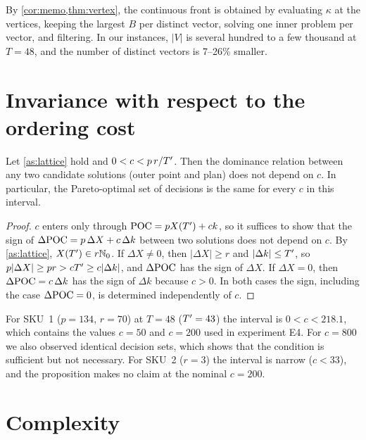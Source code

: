 By \cref{cor:memo,thm:vertex}, the continuous front is obtained by evaluating $\kappa$ at
the vertices, keeping the largest $B$ per distinct vector, solving one inner problem per
vector, and filtering. In our instances, $\lvert V\rvert$ is several hundred to a few
thousand at $T=48$, and the number of distinct vectors is 7--26\% smaller.

\section{Invariance with respect to the ordering cost}\label{sec:invariance}

\begin{proposition}\label{prop:c}
  Let \cref{as:lattice} hold and $0<c<p\,r/T'$. Then the dominance relation between any
  two candidate solutions (outer point and plan) does not depend on $c$. In particular,
  the Pareto-optimal set of decisions is the same for every $c$ in this interval.
\end{proposition}

\begin{proof}
  $c$ enters only through $\mathrm{POC}=pX(T')+ck$, so it suffices to show that the sign of
  $\Delta\mathrm{POC}=p\,\Delta X+c\,\Delta k$ between two solutions does not depend on $c$. By
  \cref{as:lattice}, $X(T')\in r\mathbb{N}_0$. If $\Delta X\ne0$, then
  $\lvert\Delta X\rvert\ge r$ and $\lvert\Delta k\rvert\le T'$, so
  $p\lvert\Delta X\rvert\ge p r>cT'\ge c\lvert\Delta k\rvert$, and $\Delta\mathrm{POC}$ has the
  sign of $\Delta X$. If $\Delta X=0$, then $\Delta\mathrm{POC}=c\,\Delta k$ has the sign of
  $\Delta k$ because $c>0$. In both cases the sign, including the case
  $\Delta\mathrm{POC}=0$, is determined independently of $c$.
\end{proof}

\begin{remark}
  For SKU~1 ($p=134$, $r=70$) at $T=48$ ($T'=43$) the interval is $0<c<218.1$, which
  contains the values $c=50$ and $c=200$ used in experiment E4. For $c=800$ we also
  observed identical decision sets, which shows that the condition is sufficient but not
  necessary. For SKU~2 ($r=3$) the interval is narrow ($c<33$), and the proposition makes
  no claim at the nominal $c=200$.
\end{remark}

\section{Complexity}\label{sec:complexity}

